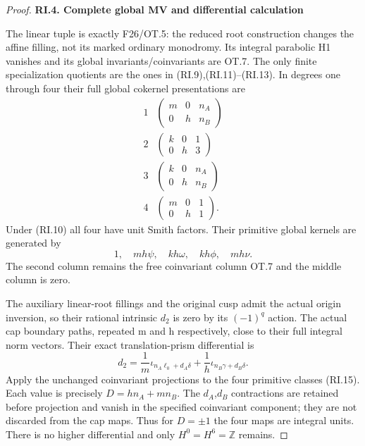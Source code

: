 \begin{proof}
\par

\medskip\noindent\textbf{RI.4. Complete global MV and differential calculation}

\par\nobreak

The linear tuple is exactly F26/OT.5: the reduced root construction
changes the affine filling, not its marked ordinary monodromy. Its
integral parabolic H1 vanishes and its global invariants/coinvariants
are OT.7. The only finite specialization quotients are the ones in
(RI.9),(RI.11)--(RI.13). In degrees one through four their full global
cokernel presentations are
\[
 \begin{array}{c|c}
 1&\begin{pmatrix}m&0&n_A\\0&h&n_B\end{pmatrix}\\[2pt]
 2&\begin{pmatrix}k&0&1\\0&h&3\end{pmatrix}\\[2pt]
 3&\begin{pmatrix}k&0&n_A\\0&h&n_B\end{pmatrix}\\[2pt]
 4&\begin{pmatrix}m&0&1\\0&h&1\end{pmatrix}.
 \end{array}                                             \tag{RI.14}
\]
Under (RI.10) all four have unit Smith factors. Their primitive global
kernels are generated by
\[
        1,\quad mh\psi,\quad kh\omega,
                        \quad kh\phi,\quad mh\nu.       \tag{RI.15}
\]
The second column remains the free coinvariant column OT.7 and the
middle column is zero.

The auxiliary linear-root fillings and the original cusp admit the
actual origin inversion, so their rational intrinsic \(d_2\) is zero by
its \((-1)^q\) action. The actual cap boundary paths, repeated m and h
respectively, close to their full integral norm vectors. Their exact
translation-prism differential is
\[
 d_2=\frac1m\iota_{n_A\ell_0+d_A\delta}
               +\frac1h\iota_{n_B\gamma+d_B\delta}.     \tag{RI.16}
\]
Apply the unchanged coinvariant projections to the four primitive
classes (RI.15). Each value is precisely \(D=h n_A+m n_B\). The \(d_A\),\(d_B\)
contractions are retained before projection and vanish in the specified
coinvariant component; they are not discarded from the cap maps.
Thus for \(D=\pm1\) the four maps are integral units. There is no
higher differential and only \(H^0=H^6=\mathbb Z\) remains.


\end{proof}
